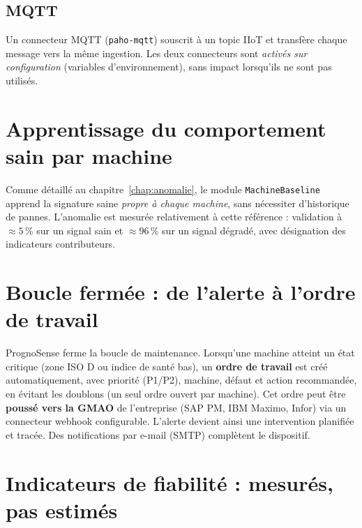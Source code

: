 \subsection{MQTT}
Un connecteur MQTT (\texttt{paho-mqtt}) souscrit à un topic IIoT et transfère chaque message
vers la même ingestion. Les deux connecteurs sont \emph{activés sur configuration}
(variables d'environnement), sans impact lorsqu'ils ne sont pas utilisés.

\section{Apprentissage du comportement sain par machine}
Comme détaillé au chapitre~\ref{chap:anomalie}, le module \texttt{MachineBaseline} apprend
la signature saine \emph{propre à chaque machine}, sans nécessiter d'historique de pannes.
L'anomalie est mesurée relativement à cette référence : validation à $\approx 5\,\%$ sur un
signal sain et $\approx 96\,\%$ sur un signal dégradé, avec désignation des indicateurs
contributeurs.

\section{Boucle fermée : de l'alerte à l'ordre de travail}
PrognoSense ferme la boucle de maintenance. Lorsqu'une machine atteint un état critique
(zone ISO D ou indice de santé bas), un \textbf{ordre de travail} est créé automatiquement,
avec priorité (P1/P2), machine, défaut et action recommandée, en évitant les doublons (un
seul ordre ouvert par machine). Cet ordre peut être \textbf{poussé vers la GMAO} de
l'entreprise (SAP PM, IBM Maximo, Infor) via un connecteur webhook configurable. L'alerte
devient ainsi une intervention planifiée et tracée. Des notifications par e-mail (SMTP)
complètent le dispositif.

\section{Indicateurs de fiabilité : mesurés, pas estimés}
